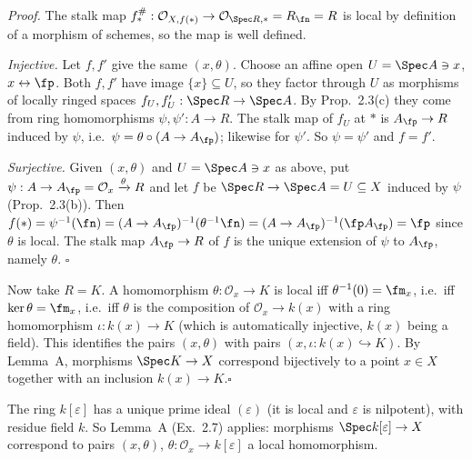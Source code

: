 \documentclass[11pt]{article}
\begin{document}
\emph{Proof.} The stalk map $f^\#_*:\mathcal O_{X,f(*)}\to\mathcal O_{\Spec R,*}=R_\fn=R$ is local by definition of a morphism of schemes, so the map is well defined.

\emph{Injective.} Let $f,f'$ give the same $(x,\theta)$. Choose an affine open $U=\Spec A\ni x$, $x\leftrightarrow\fp$. Both $f,f'$ have image $\{x\}\subseteq U$, so they factor through $U$ as morphisms of locally ringed spaces $f_U,f'_U:\Spec R\to\Spec A$. By Prop.~2.3(c) they come from ring homomorphisms $\psi,\psi':A\to R$. The stalk map of $f_U$ at $*$ is $A_\fp\to R$ induced by $\psi$, i.e.\ $\psi=\theta\circ(A\to A_\fp)$; likewise for $\psi'$. So $\psi=\psi'$ and $f=f'$.

\emph{Surjective.} Given $(x,\theta)$ and $U=\Spec A\ni x$ as above, put $\psi:A\to A_\fp=\mathcal O_x\xrightarrow{\theta}R$ and let $f$ be $\Spec R\to\Spec A=U\subseteq X$ induced by $\psi$ (Prop.~2.3(b)). Then $f(*)=\psi^{-1}(\fn)=(A\to A_\fp)^{-1}(\theta^{-1}\fn)=(A\to A_\fp)^{-1}(\fp A_\fp)=\fp$ since $\theta$ is local. The stalk map $A_\fp\to R$ of $f$ is the unique extension of $\psi$ to $A_\fp$, namely $\theta$. \hfill$\square$

Now take $R=K$. A homomorphism $\theta:\mathcal O_x\to K$ is local iff $\theta^{-1}(0)=\fm_x$, i.e.\ iff $\ker\theta=\fm_x$, i.e.\ iff $\theta$ is the composition of $\mathcal O_x\to k(x)$ with a ring homomorphism $\iota:k(x)\to K$ (which is automatically injective, $k(x)$ being a field). This identifies the pairs $(x,\theta)$ with pairs $(x,\iota:k(x)\hookrightarrow K)$. By Lemma~A, morphisms $\Spec K\to X$ correspond bijectively to a point $x\in X$ together with an inclusion $k(x)\to K$.\hfill$\square$

\pf
The ring $k[\varepsilon]$ has a unique prime ideal $(\varepsilon)$ (it is local and $\varepsilon$ is nilpotent), with residue field $k$. So Lemma~A (Ex.~2.7) applies: morphisms $\Spec k[\varepsilon]\to X$ correspond to pairs $(x,\theta)$, $\theta:\mathcal O_x\to k[\varepsilon]$ a local homomorphism.
\end{document}

